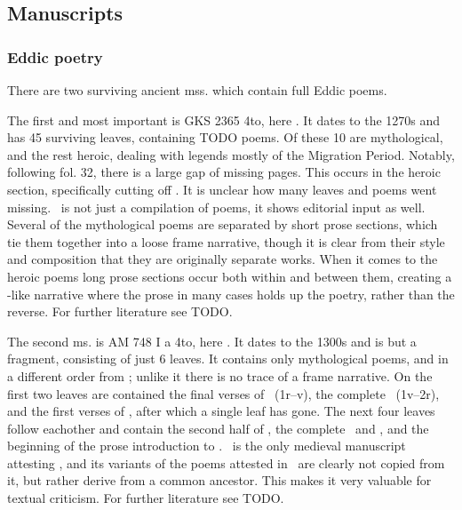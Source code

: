   \subsection{Manuscripts}

    \subsubsection{Eddic poetry}
    There are two surviving ancient mss. which contain full Eddic poems.

    The first and most important is GKS 2365 4to, here \Regius. It dates to the 1270s and has 45 surviving leaves, containing TODO poems. Of these 10 are mythological, and the rest heroic, dealing with legends mostly of the Migration Period. Notably, following fol. 32, there is a large gap of missing pages. This occurs in the heroic section, specifically cutting off \Sigrdrifumal. It is unclear how many leaves and poems went missing.
    \Regius\ is not just a compilation of poems, it shows editorial input as well. Several of the mythological poems are separated by short prose sections, which tie them together into a loose frame narrative, though it is clear from their style and composition that they are originally separate works. When it comes to the heroic poems long prose sections occur both within and between them, creating a -like narrative where the prose in many cases holds up the poetry, rather than the reverse. For further literature see TODO.

    The second ms. is AM 748 I a 4to, here \AM. It dates to the 1300s and is but a fragment, consisting of just 6 leaves. It contains only mythological poems, and in a different order from \Regius; unlike it there is no trace of a frame narrative. On the first two leaves are contained the final verses of \Harbardsljod\ (1r–v), the complete \Baldrsdraumar\ (1v–2r), and the first verses of \Skirnismal, after which a single leaf has gone. The next four leaves follow eachother and contain the second half of \Vafthrudnismal, the complete \Grimnismal\ and \Hymiskvida, and the beginning of the prose introduction to \Volundarkvida. \AM\ is the only medieval manuscript attesting \Baldrsdraumar, and its variants of the poems attested in \Regius\ are clearly not copied from it, but rather derive from a common ancestor. This makes it very valuable for textual criticism. For further literature see TODO.

